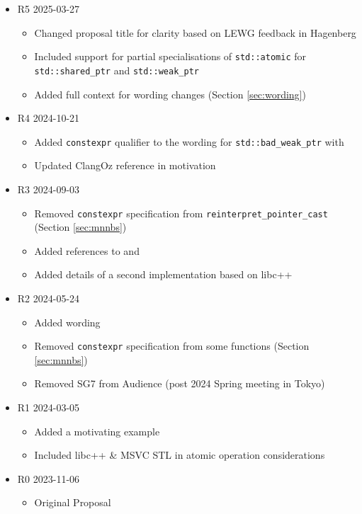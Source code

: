 \documentclass[10pt]{article}
\begin{document}
\begin{itemize}
\item R5 2025-03-27
  \begin{itemize}
  \item Changed proposal title for clarity based on LEWG feedback in Hagenberg
  \item Included support for partial specialisations of \texttt{std::atomic} for \texttt{std::shared\_ptr} and \texttt{std::weak\_ptr}
  \item Added full context for wording changes (Section \ref{sec:wording})
  \end{itemize}
\item R4 2024-10-21
  \begin{itemize}
  \item Added \texttt{constexpr} qualifier to the wording
        for \texttt{std::bad\_weak\_ptr} with \cite{P3068R6}
  \item Updated ClangOz reference in motivation
  \end{itemize}
\item R3 2024-09-03
  \begin{itemize}
  \item Removed \texttt{constexpr} specification from
        \texttt{reinterpret\_pointer\_cast} (Section \ref{sec:mnnbs})
  \item Added references to \cite{P3309R3} and \cite{P3068R6}
  \item Added details of a second implementation based on libc++
  \end{itemize}
\item R2 2024-05-24
  \begin{itemize}
  \item Added wording
  \item Removed \texttt{constexpr} specification from some
        functions (Section \ref{sec:mnnbs})
  \item Removed SG7 from Audience (post 2024 Spring meeting in Tokyo)
  \end{itemize}
\item R1 2024-03-05
  \begin{itemize}
  \item Added a motivating example
  \item Included libc++ \& MSVC STL in atomic operation considerations
  \end{itemize}
\item R0 2023-11-06
  \begin{itemize}
  \item Original Proposal
  \end{itemize}
\end{itemize}
\end{document}
